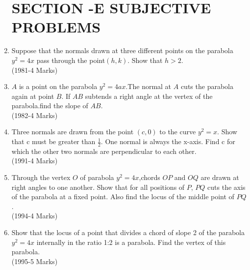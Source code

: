 \documentclass[journal,12pt,twocolumn]{IEEEtran}
\theoremstyle{remark}
\begin{document}
\begin{enumerate}
		\section{SECTION -E SUBJECTIVE PROBLEMS}
	\item Suppose that the normals drawn at three different points on the parabola $y^2=4x$ pass through the point$(h,k)$. Show that $h>2$.\\
		\hfill(1981-4 Marks)
		\\
	\item $A$ is a point on the parabola $y^2=4ax$.The normal at $A$ cuts the parabola again at point $B$. If $AB$ subtends a right angle at the vertex of the parabola.find the slope of $AB$. \\
		\hfill(1982-4 Marks)
		\\
      \item Three normals are drawn from the point $(c,0)$ to the curve $y^2=x$. Show that c must be greater than $\frac{1}{2}$. One normal is always the x-axis. Find c for which the other two normals are perpendicular to each other. \\
	      \hfill(1991-4 Marks)
		\\
	\item Through the vertex $O$ of parabola $y^2=4x$,chords $OP$ and $OQ$ are drawn at right angles to one another. Show that for all positions of $P$, $PQ$ cuts the axis of the parabola at a fixed point. Also find the locus of the middle point of $PQ$. \\
		\hfill(1994-4 Marks)
		\\
      \item Show that the locus of a point that divides a chord of slope 2 of the parabola $y^2=4x$ internally in the ratio 1:2 is a parabola. Find the vertex of this parabola. \\
	      \hfill(1995-5 Marks)


\end{enumerate}
\end{document}
